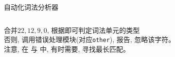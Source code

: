 
\begin{frame}{}
  \begin{center}
    自动化词法分析器
  \end{center}
\end{frame}

\begin{frame}{}
  \begin{columns}
  \end{columns}
\end{frame}

\begin{frame}{}
  \begin{columns}
      \begin{center}
      \end{center}
      \begin{center}
      \end{center}
  \end{columns}

  \vspace{0.30cm}
  \begin{center}
     合并$22, 12, 9, 0$, 根据即可判定词法单元的类型 \\[4pt]
    否则, 调用错误处理模块(对应\texttt{other}), 报告, 忽略该字符。 \\[4pt]
    注意, 在 \floatnum{} 与 \scinum{} 中, 有时需要, 寻找最长匹配。
  \end{center}
\end{frame}


